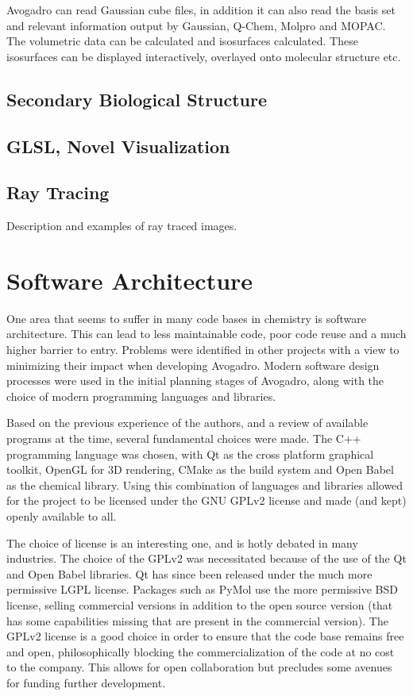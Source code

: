 \documentclass{article}
\begin{document}
Avogadro can read Gaussian cube files, in addition it can also read the basis set and relevant information output by Gaussian, Q-Chem, Molpro and MOPAC. The volumetric data can be calculated and isosurfaces calculated. These isosurfaces can be displayed interactively, overlayed onto molecular structure etc.

\subsection{Secondary Biological Structure}

\subsection{GLSL, Novel Visualization}

\subsection{Ray Tracing}

Description and examples of ray traced images.

\section{Software Architecture}

One area that seems to suffer in many code bases in chemistry is software architecture. This can lead to less maintainable code, poor code reuse and a much higher barrier to entry. Problems were identified in other projects with a view to minimizing their impact when developing Avogadro. Modern software design processes were used in the initial planning stages of Avogadro, along with the choice of modern programming languages and libraries.

Based on the previous experience of the authors, and a review of available programs at the time, several fundamental choices were made. The C++ programming language was chosen, with Qt as the cross platform graphical toolkit, OpenGL for 3D rendering, CMake as the build system and Open Babel as the chemical library. Using this combination of languages and libraries allowed for the project to be licensed under the GNU GPLv2 license and made (and kept) openly available to all.

The choice of license is an interesting one, and is hotly debated in many industries. The choice of the GPLv2 was necessitated because of the use of the Qt and Open Babel libraries. Qt has since been released under the much more permissive LGPL license. Packages such as PyMol use the more permissive BSD license, selling commercial versions in addition to the open source version (that has some capabilities missing that are present in the commercial version). The GPLv2 license is a good choice in order to ensure that the code base remains free and open, philosophically blocking the commercialization of the code at no cost to the company. This allows for open collaboration but precludes some avenues for funding further development.
\end{document}
